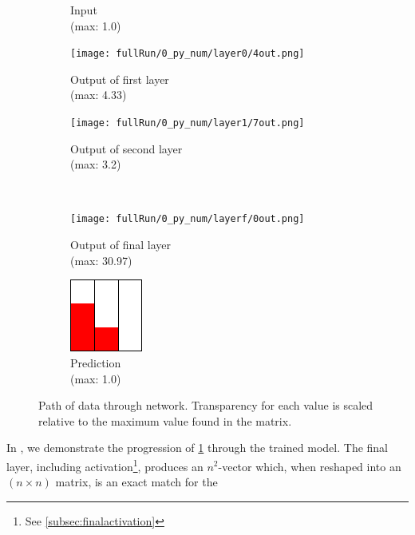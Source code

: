 \begin{figure}[h]
\begin{subfigure}{.15\textwidth}
		\caption{Input\\(max: 1.0)}
		\label{subfig:3neur_in}
	\end{subfigure}
	\hspace{.5em}
	\begin{subfigure}{.35\textwidth}
		\texttt{[image: fullRun/0\_py\_num/layer0/4out.png]}
		\caption{Output of first layer\\(max: 4.33)}
	\end{subfigure}
	\hspace{1em}
	\begin{subfigure}{.35\textwidth}
		\texttt{[image: fullRun/0\_py\_num/layer1/7out.png]}
		\caption{Output of second layer\\(max: 3.2)}
		\label{subfig:3neur_out1}
	\end{subfigure}
	\\
	\begin{subfigure}{.35\textwidth}
		\centering
		\texttt{[image: fullRun/0\_py\_num/layerf/0out.png]}
		\caption{Output of final layer\\(max: 30.97)}
		\label{subfig:3neur_outf}
	\end{subfigure}
	\begin{subfigure}{.3\textwidth}
		\centering
		\includegraphics[width=.5\textwidth]{fullRun/0_py/pred.png}
		\caption{Prediction\\(max: 1.0)}
		\label{subfig:3neur_pred}
	\end{subfigure}
	\caption{Path of data through network. Transparency for each value is scaled 
	relative to the maximum value found in the matrix.}
	\label{fig:3neur_run}
\end{figure}\noindent
In , we demonstrate the progression of 
\ref{subfig:3neur_in} through the trained model. The final layer, including 
activation\footnote{See \ref{subsec:finalactivation}}, produces an $n^2$-vector 
which, when reshaped into an $(n \times n)$ matrix, is an exact match for the 
